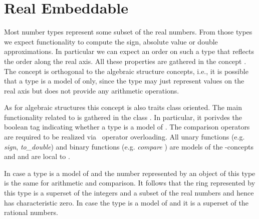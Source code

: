 \section{Real Embeddable}
\label{sec:RealEmbeddable}

Most number types represent some subset of the real numbers. From those types 
we expect functionality to compute the sign, absolute value or double 
approximations. In particular we can expect an order on such a type that 
reflects the order along the real axis. 
All these properties are gathered in the concept . 
The concept is orthogonal to the algebraic structure concepts, 
i.e., it is possible 
that a type is a model of  only, 
since the type may just represent values on the real axis
but does not provide any arithmetic operations.


As for algebraic structures this concept is also traits class oriented.
The main functionality related to  is gathered in 
the class . In particular, it porivdes the boolean 
tag   indicating whether a type is a model of 
. The comparison operators are required to be realized via 
\CC\ operator overloading. 
All unary functions (e.g. {\em sign}, {\em to\_double}) and 
binary functions (e.g. {\em compare} ) are models of the \stl-concepts 
 and  and are local 
to . 


In case a type is a model of  and  
 the number represented by an object of this type is 
the same for arithmetic and comparison.
It follows that the ring represented  by this type is a superset of the integers
and a subset of the real numbers and hence has characteristic zero.
In case the type is a model of  and  it is a 
superset of the rational numbers. 


